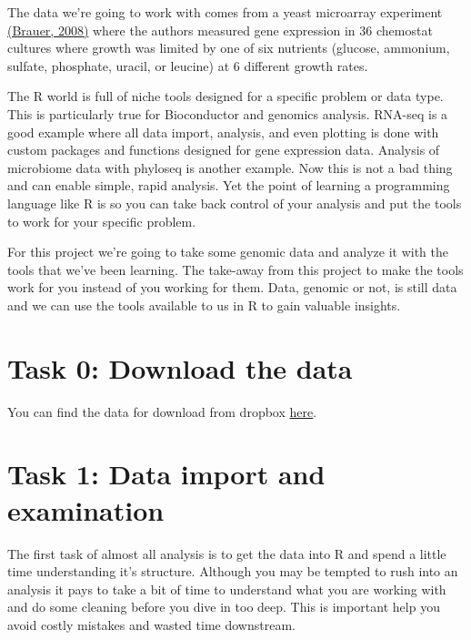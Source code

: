 \documentclass[
]{book}
\begin{document}
The data we're going to work with comes from a yeast microarray experiment \href{http://www.molbiolcell.org/content/19/1/352.abstract}{(Brauer, 2008)} where the authors measured gene expression in 36 chemostat cultures where growth was limited by one of six nutrients (glucose, ammonium, sulfate, phosphate, uracil, or leucine) at 6 different growth rates.

The R world is full of niche tools designed for a specific problem or data type. This is particularly true for Bioconductor and genomics analysis. RNA-seq is a good example where all data import, analysis, and even plotting is done with custom packages and functions designed for gene expression data. Analysis of microbiome data with phyloseq is another example. Now this is not a bad thing and can enable simple, rapid analysis. Yet the point of learning a programming language like R is so you can take back control of your analysis and put the tools to work for your specific problem.

For this project we're going to take some genomic data and analyze it with the tools that we've been learning. The take-away from this project to make the tools work for you instead of you working for them. Data, genomic or not, is still data and we can use the tools available to us in R to gain valuable insights.

\hypertarget{task-0-download-the-data}{%
\section*{Task 0: Download the data}\label{task-0-download-the-data}}

You can find the data for download from dropbox \href{https://www.dropbox.com/sh/jqu2ixdug5el66f/AAB86klTjyR-JgW502KXwbj1a?dl=0}{here}.

\hypertarget{task-1-data-import-and-examination}{%
\section*{Task 1: Data import and examination}\label{task-1-data-import-and-examination}}

The first task of almost all analysis is to get the data into R and spend a little time understanding it's structure. Although you may be tempted to rush into an analysis it pays to take a bit of time to understand what you are working with and do some cleaning before you dive in too deep. This is important help you avoid costly mistakes and wasted time downstream.
\end{document}
